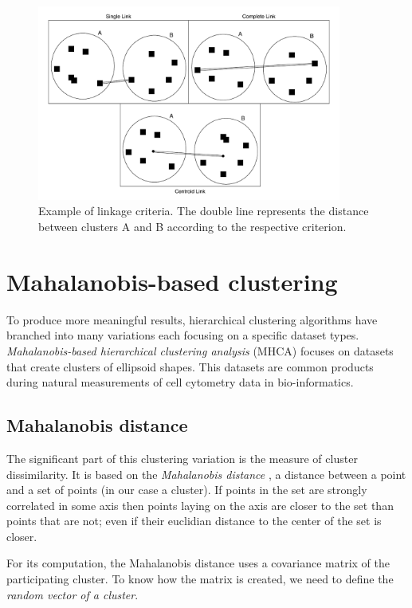 \begin{figure}\centering
	\includegraphics[width=10cm]{img/linkage_criteria}
	\caption{Example of linkage criteria. The double line represents the distance between clusters A and B according to the respective criterion.}
	\label{fig01:link}
\end{figure}

\section{Mahalanobis-based clustering}

To produce more meaningful results, hierarchical clustering algorithms have branched into many variations each focusing on a specific dataset types. \emph{Ma\-ha\-la\-no\-bis-based hierarchical clustering analysis} (MHCA) focuses on datasets that create clusters of ellipsoid shapes. This datasets are common products during natural measurements of cell cytometry data in bio-informatics.

\subsection{Mahalanobis distance}

The significant part of this clustering variation is the measure of cluster dissimilarity. It is based on the \emph{Mahalanobis distance} \cite{mahalanobis1936generalized}, a distance between a point and a set of points (in our case a cluster). If points in the set are strongly correlated in some axis then points laying on the axis are closer to the set than points that are not; even if their euclidian distance to the center of the set is closer.

For its computation, the Mahalanobis distance uses a covariance matrix of the participating cluster. To know how the matrix is created, we need to define the \emph{random vector of a cluster}. 

